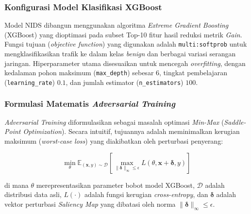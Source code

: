 \documentclass[11pt, a4paper]{article}
\begin{document}
\subsubsection{Konfigurasi Model Klasifikasi XGBoost}
Model NIDS dibangun menggunakan algoritma \textit{Extreme Gradient Boosting} (XGBoost) yang dioptimasi pada subset Top-10 fitur hasil reduksi metrik \textit{Gain}. Fungsi tujuan (\textit{objective function}) yang digunakan adalah \texttt{multi:softprob} untuk mengklasifikasikan trafik ke dalam kelas \textit{benign} dan berbagai variasi serangan jaringan. Hiperparameter utama disesuaikan untuk mencegah \textit{overfitting}, dengan kedalaman pohon maksimum (\texttt{max\_depth}) sebesar $6$, tingkat pembelajaran (\texttt{learning\_rate}) $0.1$, dan jumlah estimator (\texttt{n\_estimators}) $100$.

\subsubsection{Formulasi Matematis \textit{Adversarial Training}}
\textit{Adversarial Training} diformulasikan sebagai masalah optimasi \textit{Min-Max} (\textit{Saddle-Point Optimization}). Secara intuitif, tujuannya adalah meminimalkan kerugian maksimum (\textit{worst-case loss}) yang diakibatkan oleh perturbasi penyerang:

\begin{equation}
\min_{\theta} \mathbb{E}_{(\mathbf{x}, y) \sim \mathcal{D}} \left[ \max_{\|\boldsymbol{\delta}\|_\infty \le \epsilon} L(\theta, \mathbf{x} + \boldsymbol{\delta}, y) \right]
\end{equation}

di mana $\theta$ merepresentasikan parameter bobot model XGBoost, $\mathcal{D}$ adalah distribusi data asli, $L(\cdot)$ adalah fungsi kerugian \textit{cross-entropy}, dan $\boldsymbol{\delta}$ adalah vektor perturbasi \textit{Saliency Map} yang dibatasi oleh norma $\|\boldsymbol{\delta}\|_\infty \le \epsilon$.
\end{document}
